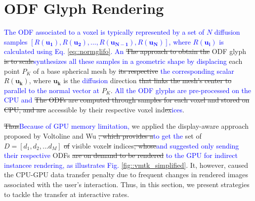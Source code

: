 \documentclass[twoside,twocolumn,10pt]{article}
\begin{document}


 

\section{ODF Glyph Rendering}
\label{sec::odf_glyph_rendering}


\textcolor{blue}{The ODF associated to a voxel is typically represented by a set of $N$ diffusion samples $[R(\bm{u_1}), R(\bm{u_2}), ..., R(\bm{u_{N-1}}), R(\bm{u_{N}})]$, where $R(\bm{u_i})$ is calculated using Eq. \ref{eq::normglifo}. An} \sout{The approach to obtain the} ODF glyph \sout{is to scale}\textcolor{blue}{synthesizes all these samples in a geometric shape by displacing} each point $P_K$ of a base spherical mesh by \sout{its respective} \textcolor{blue}{the corresponding scalar} $R(\bm{u_k})$, where $\bm{u_k}$ is the \textcolor{blue}{diffusion} direction \sout{that links the mesh's center to} \textcolor{blue}{parallel to the normal vector at} $P_K$. \textcolor{blue}{All the ODF glyphs are pre-processed on the CPU and}
\sout{The ODFs are computed through samples for each voxel and stored on CPU, and are} accessible by their respective voxel ind\sout{ex}\textcolor{blue}{ices}. 

\sout{Thus}\textcolor{blue}{Because of GPU memory limitation,} we applied the display-aware approach proposed by Voltoline and Wu \cite{voltoline2021}\sout{, which provides a}\textcolor{blue}{to get the} set of $D = [d_1, d_2, ... d_M]$ \sout{of} visible voxel\sout{s} indices\sout{, whose}\textcolor{blue}{and suggested only sending their respective} ODFs \sout{are on demand to be rendered} \textcolor{blue}{to the GPU for indirect instancee rendering, as illustrates Fig. \ref{fig::vmtk_simplified}}. It, however, caused the CPU-GPU data transfer penalty due to frequent changes in rendered images associated with the user's interaction. Thus, in this section, we present strategies to tackle the transfer at interactive rates.
\end{document}
